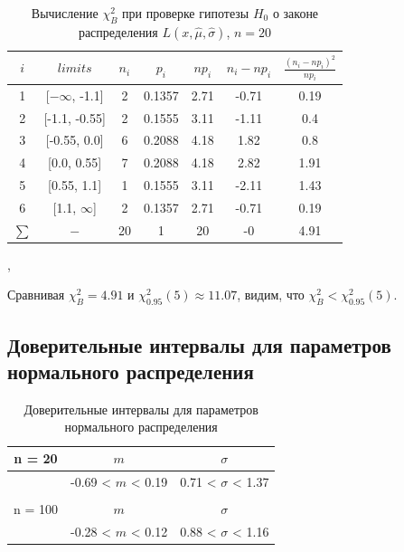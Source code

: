 \begin{table}[H]
	\centering
	\begin{tabular}{| c | c | c | c | c | c | c |}
		\hline
		$i$ & $limits$         &   $n_i$ &    $p_i$ &   $np_i$ &   $n_i - np_i$ &   $\frac{(n_i-np_i)^2}{np_i}$ \\
		\hline
		1 & [$-\infty$, -1.1] &     2 & 0.1357 &   2.71 &        -0.71 &                        0.19 \\
		2 & [-1.1, -0.55]  &    	 2 & 0.1555 &   3.11 &        -1.11 &                        0.4  \\
		3 & [-0.55, 0.0]   &     6 & 0.2088 &   4.18 &         1.82 &                        0.8  \\
		4 & [0.0, 0.55]    &    7 & 0.2088 &   4.18 &         2.82 &                        1.91 \\
		5 & [0.55, 1.1]    &     1 & 0.1555 &   3.11 &        -2.11 &                        1.43 \\
		6 & [1.1,  $\infty$]   &    2 & 0.1357 &   2.71 &        -0.71 &                        0.19 \\
		$\sum$ & $-$              &    20 & 1      &  20    &        -0    &                        4.91 \\
		\hline
	\end{tabular}
	\caption{ Вычисление $\chi^{2}_{B}$ при проверке гипотезы $H_{0}$ о законе распределения $L(x,\hat{\mu}, \hat{\sigma})$, $n=20$},
	\label{tab:laplace_chi_2}
\end{table}
Сравнивая $\chi^{2}_{B} = 4.91$ и $\chi^{2}_{0.95}(5) \approx 11.07$, видим, что $\chi^{2}_{B} < \chi^{2}_{0.95}(5)$.

\subsection{Доверительные интервалы для параметров нормального распределения}
\begin{table}[H]
	\centering
	\begin{tabular}{| c | c | c |}
		\hline
		n = 20   &  $m$  & $\sigma$\\ \hline
		&  -0.69 < $m$ < 0.19 & 0.71 < $\sigma$ < 1.37 \\ \hline
		&   &   \\ \hline
		n = 100   &  $m$  & $\sigma$\\ \hline
		& -0.28 < $m$ < 0.12 & 0.88 < $\sigma$ < 1.16 \\
		\hline
	\end{tabular}
	\caption{Доверительные интервалы для параметров нормального распределения}
	\label{tab:interv_simple}
\end{table}

